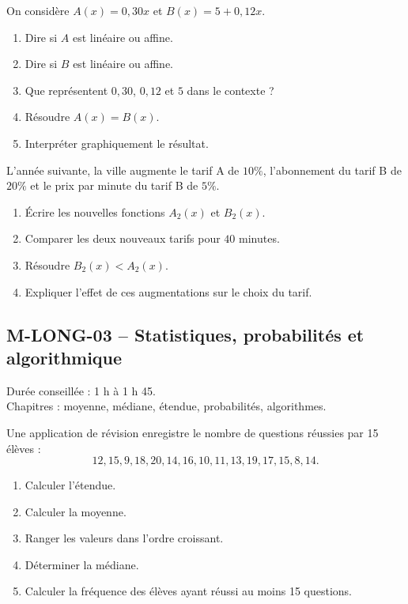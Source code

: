 \documentclass[11pt,a4paper]{article}
\newcounter{exercice}
\begin{document}
\begin{exercice}
On considère $A(x)=0{,}30x$ et $B(x)=5+0{,}12x$.
\begin{enumerate}
  \item Dire si $A$ est linéaire ou affine.
  \item Dire si $B$ est linéaire ou affine.
  \item Que représentent $0{,}30$, $0{,}12$ et $5$ dans le contexte ?
  \item Résoudre $A(x)=B(x)$.
  \item Interpréter graphiquement le résultat.
\end{enumerate}
\end{exercice}

\begin{exercice}
L'année suivante, la ville augmente le tarif A de $10\%$, l'abonnement du tarif B de $20\%$ et le prix par minute du tarif B de $5\%$.
\begin{enumerate}
  \item Écrire les nouvelles fonctions $A_2(x)$ et $B_2(x)$.
  \item Comparer les deux nouveaux tarifs pour $40$ minutes.
  \item Résoudre $B_2(x)<A_2(x)$.
  \item Expliquer l'effet de ces augmentations sur le choix du tarif.
\end{enumerate}
\end{exercice}
\newpage
\subsection{M-LONG-03 -- Statistiques, probabilités et algorithmique}

\begin{objectif}
Durée conseillée : 1 h à 1 h 45.\\
Chapitres : moyenne, médiane, étendue, probabilités, algorithmes.
\end{objectif}
\begin{exercice}
Une application de révision enregistre le nombre de questions réussies par 15 élèves :
\[
12,15,9,18,20,14,16,10,11,13,19,17,15,8,14.
\]
\begin{enumerate}
  \item Calculer l'étendue.
  \item Calculer la moyenne.
  \item Ranger les valeurs dans l'ordre croissant.
  \item Déterminer la médiane.
  \item Calculer la fréquence des élèves ayant réussi au moins 15 questions.
\end{enumerate}
\end{exercice}
\end{document}
